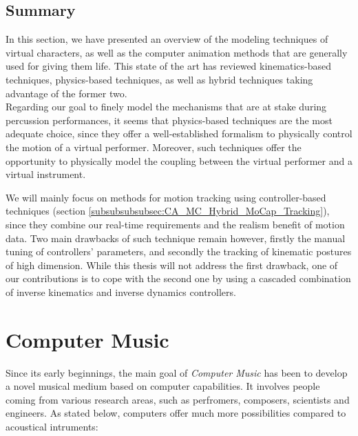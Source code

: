 {{		\subsection{Summary}
		\label{subsec:CA_Summary}

In this section, we have presented an overview of the modeling techniques of virtual characters, as well as the computer animation methods that are generally used for giving them life. This state of the art has reviewed kinematics-based techniques, physics-based techniques, as well as hybrid techniques taking advantage of the former two.\\

Regarding our goal to finely model the mechanisms that are at stake during percussion performances, it seems that physics-based techniques are the most adequate choice, since they offer a well-established formalism to physically control the motion of a virtual performer. Moreover, such techniques offer the opportunity to physically model the coupling between the virtual performer and a virtual instrument.

We will mainly focus on methods for motion tracking using controller-based techniques (section \ref{subsubsubsubsec:CA_MC_Hybrid_MoCap_Tracking}), since they combine our real-time requirements and the realism benefit of motion data. Two main drawbacks of such technique remain however, firstly the manual tuning of controllers' parameters, and secondly the tracking of kinematic postures of high dimension. While this thesis  will not address the first drawback, one of our contributions is to cope with the second one by using a cascaded combination of inverse kinematics and inverse dynamics controllers.

\newpage\vfill




	\section{Computer Music}
	\label{sec:CM}

Since its early beginnings, the main goal of \emph{Computer Music} has been to develop a novel musical medium based on computer capabilities. It involves people coming from various research areas, such as perfromers, composers, scientists and engineers. As stated below, computers offer much more possibilities compared to acoustical intruments:\\

}}
